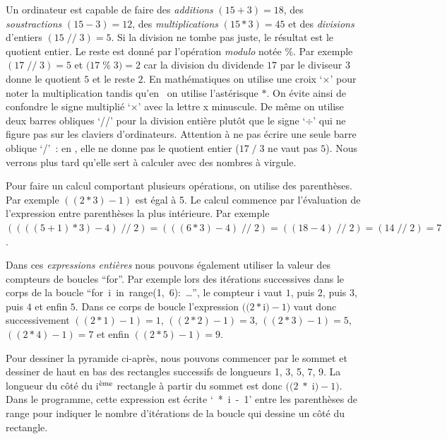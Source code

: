 Un ordinateur est capable de faire des {\em additions} $(15 + 3) = 18$, des {\em soustractions} 
$(15 - 3) = 12$, 
des {\em multiplications} $(15 \ast 3) = 45$ et des {\em divisions} d'entiers $(15 \;/\!/\; 3) = 5$. 
Si la division ne tombe pas juste,
le résultat est le quotient entier. Le reste est donné
par l'opération {\em modulo} notée {\idt \%}. Par exemple 
$(17 \;/\!/\; 3) = 5$ et $(17 \;${\idt \%}$\; 3) = 2$ car la division du dividende $17$
par le diviseur $3$ donne le quotient $5$ et le reste $2$. En mathématiques on utilise une croix
`$\times$' pour noter la multiplication tandis qu'en \python\ on utilise l'astérisque $\ast$.
On évite ainsi de confondre le signe multiplié `$\times$' avec la lettre {\idt x} minuscule.
De même on utilise deux barres obliques `{\idt //}' pour la division entière plutôt que le signe
`$\div$' qui ne figure pas sur les claviers d'ordinateurs.
Attention à ne pas écrire une seule barre oblique `{\idt /}'~: en \python, elle ne donne pas le
quotient entier ($17 \;/\; 3$ ne vaut pas $5$). Nous verrons plus tard qu'elle sert à calculer avec des 
nombres à virgule.

Pour faire un calcul comportant plusieurs opérations, on utilise des pa\-ren\-thè\-ses. Par exemple
$((2 \ast 3) - 1)$ est égal à 5. Le calcul commence par l'évaluation de l'expression 
entre parenthèses la plus intérieure. 
Par exemple $((((5 + 1) \ast 3) - 4) \;/\!/\; 2) = (((6 \ast 3) - 4) \;/\!/\; 2) = 
((18 - 4) \;/\!/\; 2) = (14 \;/\!/\; 2) = 7$.  

Dans ces {\em expressions entières}
nous pouvons également utiliser la valeur des compteurs de boucles ``for''. Par exemple 
lors des itérations successives dans le corps de la boucle
``{\mcl for}\ {\idt i}\ {\mcl in}\ {\idt range(1,\ 6):}\ \ldots'',
le compteur {\idt i} vaut $1$, puis $2$, puis $3$, puis $4$ et enfin $5$. 
Dans ce corps de boucle l'expression $((2 \ast ${\idt  i}$) - 1)$ vaut donc successivement 
$((2 \ast 1) - 1) = 1$, $((2 \ast 2) - 1) = 3$, $((2 \ast 3) - 1) = 5$, $((2 \ast 4) - 1) = 7$ et enfin
$((2 \ast 5) - 1) = 9$.

\begin{exemple}[Pyramide]
Pour dessiner la pyramide ci-après, nous pouvons commencer par le sommet et dessiner de
haut en bas des rectangles successifs de longueurs 1, 3, 5, 7, 9. La longueur du
côté du {\idt i}$^{\rm\grave{e}me}$ rectangle à partir du sommet est 
donc $((2\;\ast\;${\idt  i}$) - 1)$. Dans le programme, cette expression est écrite
`{\ *\ i\ -\ 1}' entre les parenthèses de {\idt range} pour indiquer le nombre d'itérations
de la boucle qui dessine un côté du rectangle.

\pagebreak[3]
\vspace*{22mm}%
%
\vspace*{-22mm}%

\end{exemple}


